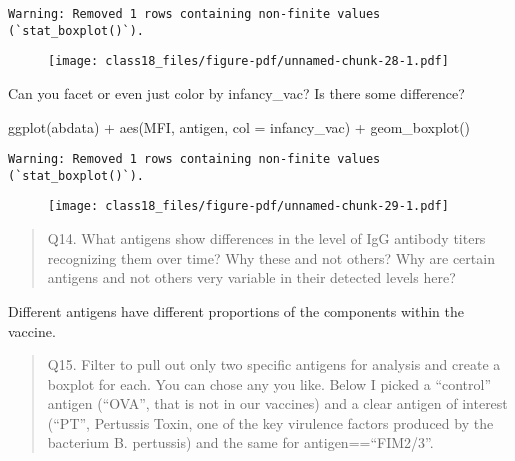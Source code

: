 \documentclass[
  letterpaper,
  DIV=11,
  numbers=noendperiod]{scrartcl}
\newenvironment{Shaded}{\begin{snugshade}}{\end{snugshade}}
\newcommand{\AttributeTok}[1]{\textcolor[rgb]{0.40,0.45,0.13}{#1}}
\newcommand{\FunctionTok}[1]{\textcolor[rgb]{0.28,0.35,0.67}{#1}}
\newcommand{\NormalTok}[1]{\textcolor[rgb]{0.00,0.23,0.31}{#1}}
\newcommand{\SpecialCharTok}[1]{\textcolor[rgb]{0.37,0.37,0.37}{#1}}
\begin{document}
\begin{verbatim}
Warning: Removed 1 rows containing non-finite values (`stat_boxplot()`).
\end{verbatim}

\begin{figure}[H]

{\centering \texttt{[image: class18\_files/figure-pdf/unnamed-chunk-28-1.pdf]}

}

\end{figure}

Can you facet or even just color by infancy\_vac? Is there some
difference?

\begin{Shaded}
\begin{Highlighting}[]
\FunctionTok{ggplot}\NormalTok{(abdata) }\SpecialCharTok{+}
  \FunctionTok{aes}\NormalTok{(MFI, antigen, }\AttributeTok{col =}\NormalTok{ infancy\_vac) }\SpecialCharTok{+}
  \FunctionTok{geom\_boxplot}\NormalTok{() }
\end{Highlighting}
\end{Shaded}

\begin{verbatim}
Warning: Removed 1 rows containing non-finite values (`stat_boxplot()`).
\end{verbatim}

\begin{figure}[H]

{\centering \texttt{[image: class18\_files/figure-pdf/unnamed-chunk-29-1.pdf]}

}

\end{figure}

\begin{quote}
Q14. What antigens show differences in the level of IgG antibody titers
recognizing them over time? Why these and not others? Why are certain
antigens and not others very variable in their detected levels here?
\end{quote}

Different antigens have different proportions of the components within
the vaccine.

\begin{quote}
Q15. Filter to pull out only two specific antigens for analysis and
create a boxplot for each. You can chose any you like. Below I picked a
``control'' antigen (``OVA'', that is not in our vaccines) and a clear
antigen of interest (``PT'', Pertussis Toxin, one of the key virulence
factors produced by the bacterium B. pertussis) and the same for
antigen==``FIM2/3''.
\end{quote}
\end{document}
